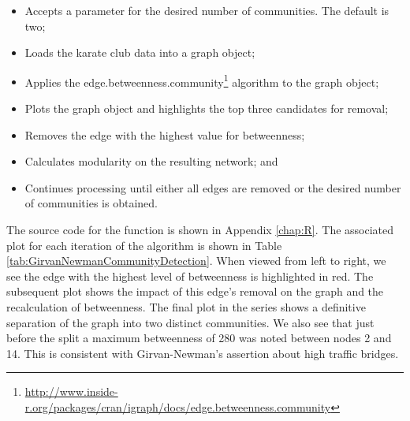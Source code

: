 \documentclass[letterpaper,11pt]{report}
\begin{document}
\begin{savenotes}
\begin{itemize}
\item Accepts a parameter for the desired number of communities. The default is two;
\item Loads the karate club data into a graph object;
\item Applies the edge.betweenness.community\footnote{\url{http://www.inside-r.org/packages/cran/igraph/docs/edge.betweenness.community}} algorithm to the graph object;
\item Plots the graph object and highlights the top three candidates for removal;
\item Removes the edge with the highest value for betweenness;
\item Calculates modularity on the resulting network; and
\item Continues processing until either all edges are removed or the desired number of communities is obtained.
\end{itemize}

\indent{}The source code for the function is shown in Appendix \ref{chap:R}. The associated plot for each iteration of the algorithm is shown in Table \ref{tab:GirvanNewmanCommunityDetection}. When viewed from left to right, we see the edge with the highest level of betweenness is highlighted in red. The subsequent plot shows the impact of this edge's removal on the graph and the recalculation of betweenness. The final plot in the series shows a definitive separation of the graph into two distinct communities. We also see that just before the split a maximum betweenness of 280 was noted between nodes 2 and 14. This is consistent with Girvan-Newman's assertion about high traffic bridges.


\end{savenotes}
\end{document}

